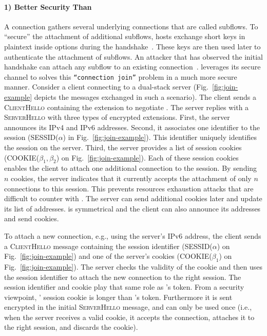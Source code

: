 \paragraph*{1) Better Security Than \mptcp} A \mptcp connection gathers several
underlying connections that are called subflows. To ``secure'' the attachment of
additional subflows, \mptcp hosts exchange short keys in plaintext inside \tcp
options during the \tcp handshake~\cite{rfc6824, rfc8684}. These keys are then
used later to authenticate the attachment of subflows. An
attacker that has observed the initial handshake can attach any subflow to an
existing \mptcp connection~\cite{rfc6181}. \tcpls leverages its secure channel to solves this \texttt{``connection join''} problem in a much more secure manner. Consider a client connecting to a dual-stack server (Fig.~\ref{fig:join-example} depicts the \tls messages exchanged in such a scenario). The client sends a \textsc{ClientHello} containing the \tcpls extension to negotiate \tcpls. The server replies with a \textsc{ServerHello} with three types of encrypted extensions. First, the server announces its IPv4 and IPv6 addresses. Second, it associates one identifier to the \tcpls session (SESSID($\alpha$) in Fig.~\ref{fig:join-example}). This identifier uniquely identifies the \tcpls session on the server. Third, the server provides a list of \tcpls session cookies (COOKIE($\beta_1,\beta_2$) on Fig.~\ref{fig:join-example}). Each of these session cookies enables the client to attach one additional \tcp connection to the \tcpls session. By sending $n$ cookies, the server indicates that it currently accepts the attachment of only $n$ \tcp connections to this session. This prevents resources exhaustion attacks that are difficult to counter with \mptcp. The server can send additional cookies later and update its list of addresses. \tcpls is symmetrical and the client can also announce its addresses and send cookies.

To attach a new connection, e.g., using the server's IPv6 address, the client
sends a \textsc{ClientHello} message containing the session identifier
(SESSID($\alpha$) on Fig.~\ref{fig:join-example}) and one of the server's cookies (COOKIE($\beta_1$) on Fig.~\ref{fig:join-example}). The server checks the validity of the cookie and then uses the session identifier to attach the new \tcp connection to the right \tcpls session. The session identifier and cookie play that same role as \mptcp's token. From a security viewpoint, \tcpls'
session cookie is longer than \mptcp's token. Furthermore it is sent encrypted in the initial \textsc{ServerHello} message, and can only be used once (i.e., when the server receives a valid cookie, it accepts the connection, attaches it to the right \tcpls session, and discards the cookie).

